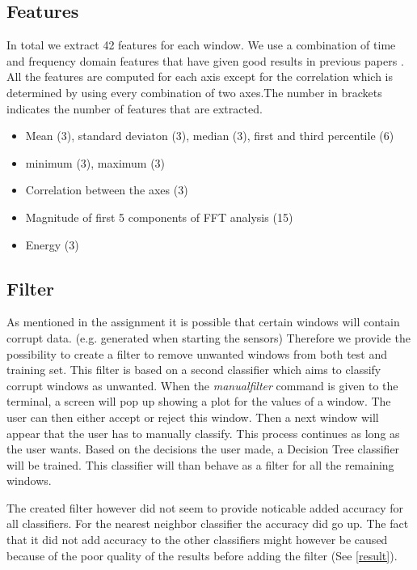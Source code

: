 \subsection{Features}
In total we extract 42 features for each window. We use a combination of time and frequency domain features that have given good results in previous papers \cite{bao2004activity}\cite{preece2009comparison}. 
All the features are computed for each axis except for the correlation which is determined by using every combination of two axes.The number in brackets indicates the number of features that are extracted.
\begin{itemize}
  \item Mean (3), standard deviaton (3), median (3), first and third percentile (6)
  \item minimum (3), maximum (3)
  \item Correlation between the axes (3)
  \item Magnitude of first 5 components of FFT analysis (15)
  \item Energy (3)
\end{itemize}

\subsection{Filter}
As mentioned in the assignment it is possible that certain windows will contain corrupt data. (e.g. generated when starting the sensors) Therefore we provide the possibility to create a filter to remove unwanted windows from both test and training set.
This filter is based on a second classifier which aims to classify corrupt windows as unwanted.
When the \textit{manualfilter} command is given to the terminal, a screen will pop up showing a plot for the values of a window. The user can then either accept or reject this window. Then a next window will appear that the user has to manually classify. This process continues as long as the user wants.
Based on the decisions the user made, a Decision Tree classifier will be trained.
This classifier will than behave as a filter for all the remaining windows.

The created filter however did not seem to provide noticable added accuracy for all classifiers. For the nearest neighbor classifier the accuracy did go up. The fact that it did not add accuracy to the other classifiers might however be caused because of the poor quality of the results before adding the filter (See \ref{result}).

